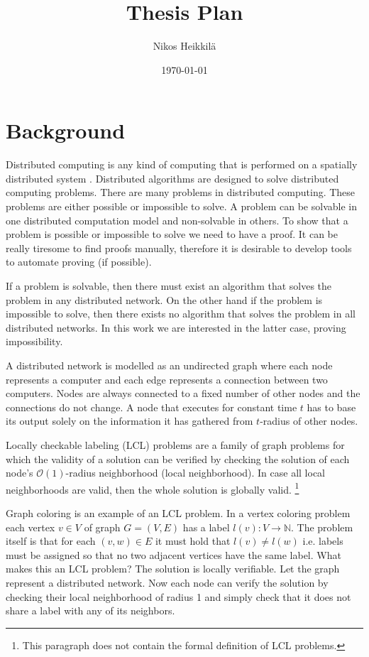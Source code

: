 \documentclass[12pt,a4paper,english,oneside]{article}
\begin{document}
\title{Thesis Plan}
\author{Nikos Heikkilä}
\date{\today}
\maketitle

\section*{Background}

Distributed computing is any kind of computing that is performed on a spatially distributed system
\cite{DBLP:books/el/leeuwen90/LamportL90}.
Distributed algorithms are designed to solve distributed computing problems.
There are many problems in distributed computing.
These problems are either possible or impossible to solve.
A problem can be solvable in one distributed computation model and non-solvable in others.
To show that a problem is possible or impossible to solve we need to have a proof.
It can be really tiresome to find proofs manually, therefore it is desirable to develop tools to automate proving (if possible).

If a problem is solvable, then there must exist an algorithm that solves the problem in any distributed network.
On the other hand if the problem is impossible to solve, then there exists no algorithm that solves the problem in all distributed networks.
In this work we are interested in the latter case, proving impossibility.

A distributed network is modelled as an undirected graph where each node represents a computer and each edge represents a connection between two computers.
Nodes are always connected to a fixed number of other nodes and the connections do not change.
A node that executes for constant time $t$ has to base its output solely on the information it has gathered from $t$-radius of other nodes.
\cite{DBLP:journals/siamcomp/NaorS95}

Locally checkable labeling (LCL) problems are a family of graph problems for which the validity of a solution can be verified by checking the solution of each node's $\mathcal{O}(1)$-radius neighborhood (local neighborhood).
In case all local neighborhoods are valid, then the whole solution is globally valid.
\cite{DBLP:conf/podc/BrandtHKLOPRSU17}
\footnote{This paragraph does not contain the formal definition of LCL problems.}

Graph coloring is an example of an LCL problem.
In a vertex coloring problem each vertex $v \in V$ of graph $G = (V, E)$ has a label $l(v): V \rightarrow \mathbb{N}$.
The problem itself is that for each $(v, w) \in E$ it must hold that $l(v) \neq l(w)$ i.e. labels must be assigned so that no two adjacent vertices have the same label.
What makes this an LCL problem?
The solution is locally verifiable.
Let the graph represent a distributed network.
Now each node can verify the solution by checking their local neighborhood of radius 1 and simply check that it does not share a label with any of its neighbors.
\end{document}
